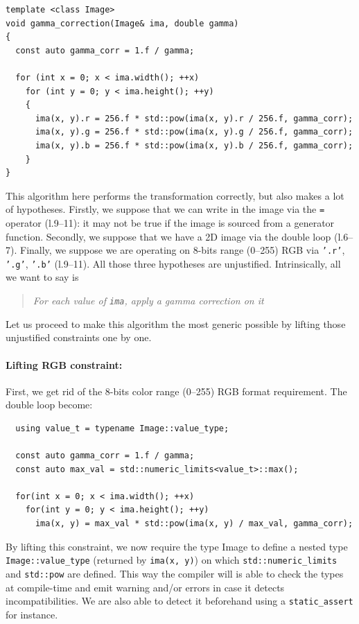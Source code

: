 \begin{verbatim}
template <class Image>
void gamma_correction(Image& ima, double gamma)
{
  const auto gamma_corr = 1.f / gamma;

  for (int x = 0; x < ima.width(); ++x)
    for (int y = 0; y < ima.height(); ++y)
    {
      ima(x, y).r = 256.f * std::pow(ima(x, y).r / 256.f, gamma_corr);
      ima(x, y).g = 256.f * std::pow(ima(x, y).g / 256.f, gamma_corr);
      ima(x, y).b = 256.f * std::pow(ima(x, y).b / 256.f, gamma_corr);
    }
}
\end{verbatim}

\noindent This algorithm here performs the transformation correctly, but also makes a lot of hypotheses. Firstly, we
suppose that we can write in the image via the \texttt{=} operator (l.9--11): it may not be true if the image is sourced
from a generator function. Secondly, we suppose that we have a 2D image via the double loop (l.6--7). Finally, we
suppose we are operating on 8-bits range (0--255) RGB via \texttt{'.r'}, \texttt{'.g'}, \texttt{'.b'} (l.9--11). All
those three hypotheses are unjustified. Intrinsically, all we want to say is \blockquote{\emph{For each value of
    \texttt{ima}, apply a gamma correction on it}}. Let us proceed to make this algorithm the most generic possible by
lifting those unjustified constraints one by one.



\paragraph{Lifting RGB constraint:}
First, we get rid of the 8-bits color range (0--255) RGB format requirement. The double loop become:

\begin{verbatim}
  using value_t = typename Image::value_type;

  const auto gamma_corr = 1.f / gamma;
  const auto max_val = std::numeric_limits<value_t>::max();

  for(int x = 0; x < ima.width(); ++x)
    for(int y = 0; y < ima.height(); ++y)
      ima(x, y) = max_val * std::pow(ima(x, y) / max_val, gamma_corr);
\end{verbatim}

\noindent By lifting this constraint, we now require the type Image to define a nested type\\
\texttt{Image::value\_type} (returned by \texttt{ima(x, y)}) on which \texttt{std::numeric\_limits} and
\texttt{std::pow} are defined. This way the compiler will is able to check the types at compile-time and emit warning
and/or errors in case it detects incompatibilities. We are also able to detect it beforehand using a
\texttt{static\_assert} for instance.



